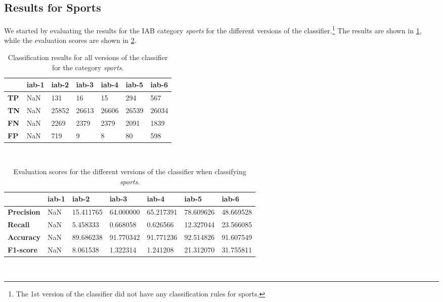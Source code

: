 

\subsection{Results for Sports}
We started by evaluating the results for the IAB category \emph{sports} for the different versions of the classifier.\footnote{The 1st version of the classifier did not have any classification rules for sports.} The results are shown in \ref{tab:iabresults_sports}, while the evaluation scores are shown in \ref{tab:precision_sports}. 

\begin{table}[h]
\centering
\renewcommand{\arraystretch}{1.25}
\begin{tabularx}{\textwidth}{l|  X|X|X|X|X|X }
         & {\bf iab-1} & {\bf iab-2} & {\bf iab-3} & {\bf iab-4} & {\bf iab-5} & {\bf iab-6} \\ \hline
{\bf TP}        & NaN       & 131         & 16          & 15          & 294         & 567         \\ \hline
{\bf TN}        & NaN       & 25852       & 26613       & 26606       & 26539       & 26034       \\ \hline
{\bf FN}        & NaN       & 2269        & 2379        & 2379        & 2091        & 1839        \\ \hline
{\bf FP}        & NaN       & 719         & 9           & 8           & 80          & 598         \\ 
\end{tabularx}
\\[10pt]
\caption[Classification results for \emph{sports}]{Classification results for all versions of the classifier for the category \emph{sports}.}
\label{tab:iabresults_sports}
\end{table}

\begin{table}[h]
\centering
\renewcommand{\arraystretch}{1.25}
\begin{tabularx}{\textwidth}{l|  l|l|l|l|l|l }
                & {\bf iab-1} & {\bf iab-2} & {\bf iab-3} & {\bf iab-4} & {\bf iab-5} & {\bf iab-6} \\ \hline
{\bf Precision} & NaN         & 15.411765   & 64.000000   & 65.217391   & 78.609626   & 48.669528   \\ \hline
{\bf Recall}    & NaN         & 5.458333    & 0.668058    & 0.626566    & 12.327044   & 23.566085   \\ \hline
{\bf Accuracy}  & NaN         & 89.686238   & 91.770342   & 91.771236   & 92.514826   & 91.607549   \\ \hline
{\bf F1-score}  & NaN         & 8.061538    & 1.322314    & 1.241208    & 21.312070   & 31.755811   \\
\end{tabularx}
\\[10pt]
\caption[Categorization results for \emph{Sports}]{Evaluation scores for the different versions of the classifier when classifying \emph{sports}.}
\label{tab:precision_sports}
\end{table}


